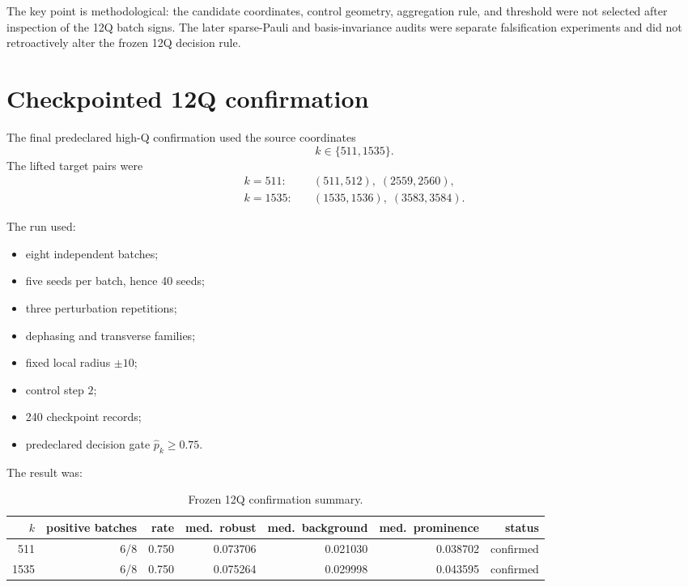 \documentclass[11pt,a4paper]{article}
\begin{document}
The key point is methodological: the candidate coordinates, control geometry,
aggregation rule, and threshold were not selected after inspection of the
12Q batch signs.  The later sparse-Pauli and basis-invariance audits were
separate falsification experiments and did not retroactively alter the
frozen 12Q decision rule.

\section{Checkpointed 12Q confirmation}

The final predeclared high-Q confirmation used the source coordinates
\[
k\in\{511,1535\}.
\]
The lifted target pairs were
\[
\begin{aligned}
k=511:\quad
&(511,512),\;(2559,2560),\\
k=1535:\quad
&(1535,1536),\;(3583,3584).
\end{aligned}
\]

The run used:

\begin{itemize}
\item eight independent batches;
\item five seeds per batch, hence 40 seeds;
\item three perturbation repetitions;
\item dephasing and transverse families;
\item fixed local radius \(\pm10\);
\item control step \(2\);
\item 240 checkpoint records;
\item predeclared decision gate
      \(\widehat p_k\ge0.75\).
\end{itemize}

The result was:

\begin{table}[H]
\centering
\caption{Frozen 12Q confirmation summary.}
\begin{tabular}{@{}rrrrrrr@{}}
\toprule
\(k\) & positive batches & rate & med.\ robust & med.\ background &
med.\ prominence & status\\
\midrule
511  & 6/8 & 0.750 & 0.073706 & 0.021030 & 0.038702 & confirmed\\
1535 & 6/8 & 0.750 & 0.075264 & 0.029998 & 0.043595 & confirmed\\
\bottomrule
\end{tabular}
\end{table}
\end{document}
